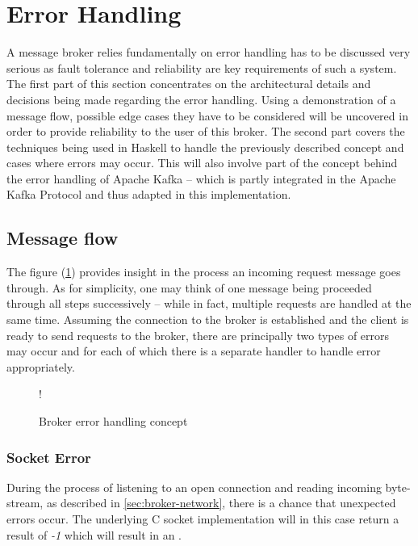 \section{Error Handling}
\label{sec:broker-error-handling}

A message broker relies fundamentally on error handling has to be discussed very
serious as fault tolerance and reliability are key requirements of such a
system. The first part of this section concentrates on the architectural details
and decisions being made regarding the error handling. Using a demonstration of
a message flow, possible edge cases they have to be considered will be uncovered
in order to provide reliability to the user of this broker. The second part
covers the techniques being used in Haskell to handle the previously described
concept and cases where errors may occur. This will also involve part of the
concept behind the error handling of Apache Kafka -- which is partly integrated
in the Apache Kafka Protocol and thus adapted in this implementation.

\subsection{Message flow}

The figure (\ref{fig:broker-error-activity}) provides insight in the process an
incoming request message goes through. As for simplicity, one may think of one
message being proceeded through all steps successively -- while in fact,
multiple requests are handled at the same time. Assuming the connection to the
broker is established and the client is ready to send requests to the broker,
there are principally two types of errors may occur and for each of which there
is a separate handler to handle error appropriately.

\begin{figure}[H]
  \centering
   {!} {
    
  }
  \caption{Broker error handling concept}
  \label{fig:broker-error-activity}
\end{figure}

\subsubsection{Socket Error}

During the process of listening to an open connection and reading incoming
byte-stream, as described in \ref{sec:broker-network}, there is a chance that
unexpected errors occur. The underlying C socket implementation will in this
case return a result of \textit{-1} which will result in an
. 

